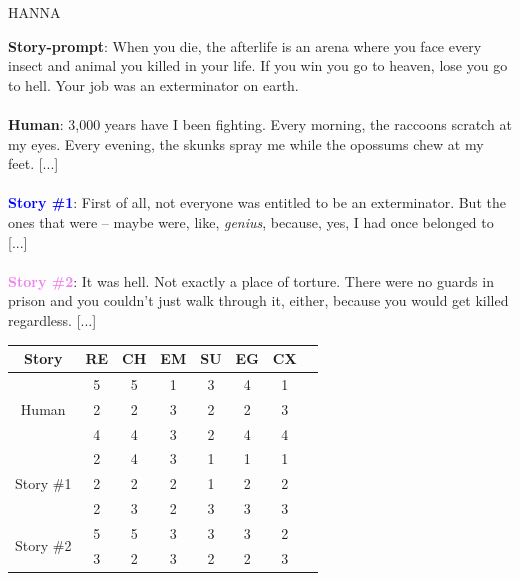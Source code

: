\begin{frame}{HANNA}
    \begin{table}[h!]
        \tiny
        \centering
        \begin{minipage}{0.4\columnwidth}
        \noindent \textbf{Story-prompt}: When you die, the afterlife is an arena where you face every insect and animal you killed in your life. If you win you go to heaven, lose you go to hell. Your job was an exterminator on earth.\\
        \\
        \noindent \textbf{Human}: 3,000 years have I been fighting. Every morning, the raccoons scratch at my eyes. Every evening, the skunks spray me while the opossums chew at my feet. [...]\\
        \\
        \noindent \textcolor{blue}{\textbf{Story \#1}}: First of all, not everyone was entitled to be an exterminator. But the ones that were – maybe were, like, \emph{genius}, because, yes, I had once belonged to [...]\\
        \\
        \noindent \textcolor{violet}{\textbf{Story \#2}}: It was hell. Not exactly a place of torture. There were no guards in prison and you couldn't just walk through it, either, because you would get killed regardless. [...]\\
        \end{minipage}
        \hspace{0.2cm}
        \begin{minipage}{0.5\columnwidth}
        \centering
        \begin{tabular}{cccccccc}
        \toprule
        Story & \textsc{RE} & \textsc{CH} & \textsc{EM} & \textsc{SU} & \textsc{EG} & \textsc{CX}\\
        \midrule
        \multirow{3}{*}{Human} & 5 & 5 & 1 & 3 & 4 & 1 \\
        & 2 & 2 & 3 & 2 & 2 & 3\\
        & 4 & 4 & 3 & 2 & 4 & 4 \\
        \midrule
        \multirow{3}{*}{\color{blue}Story \#1} & 2 & 4 & 3 & 1 & 1 & 1 \\
        & 2 & 2 & 2 & 1 & 2 & 2\\
        & 2 & 3 & 2 & 3 & 3 & 3 \\
        \midrule
        \multirow{3}{*}{\color{violet}Story \#2} & 5 & 5 & 3 & 3 & 3 & 2 \\
        & 3 & 2 & 3 & 2 & 2 & 3\\

\end{tabular}
\end{minipage}
\end{table}
\end{frame}
